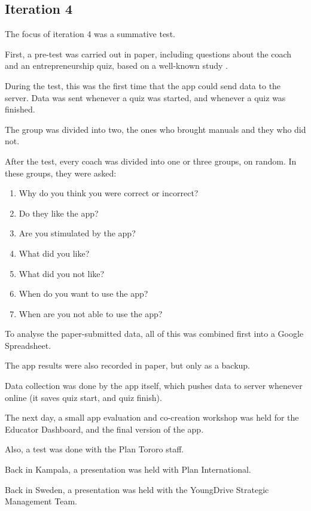 \subsection{Iteration 4}

The focus of iteration 4 was a summative test.

First, a pre-test was carried out in paper, including questions about the coach and an entrepreneurship quiz, based on a well-known study \cite{general-entrepreneurship-quiz}.

During the test, this was the first time that the app could send data to the server. Data was sent whenever a quiz was started, and whenever a quiz was finished.

The group was divided into two, the ones who brought manuals and they who did not.

After the test, every coach was divided into one or three groups, on random. In these groups, they were asked:

\begin{enumerate}
\item Why do you think you were correct or incorrect?
\item Do they like the app?
\item Are you stimulated by the app?
\item What did you like?
\item What did you not like?
\item When do you want to use the app?
\item When are you not able to use the app?
\end{enumerate}

To analyse the paper-submitted data, all of this was combined first into a Google Spreadsheet.

The app results were also recorded in paper, but only as a backup.

Data collection was done by the app itself, which pushes data to server whenever online (it saves quiz start, and quiz finish).

The next day, a small app evaluation and co-creation workshop was held for the Educator Dashboard, and the final version of the app.

Also, a test was done with the Plan Tororo staff.

Back in Kampala, a presentation was held with Plan International.

Back in Sweden, a presentation was held with the YoungDrive Strategic Management Team.

